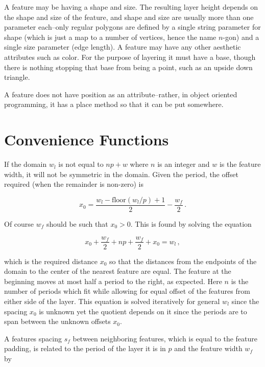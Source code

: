 \documentclass{article}
\begin{document}
A feature may be having a shape and size. The resulting layer height depends on the shape and size of the feature, and shape and size are usually more than one parameter each--only regular polygons are defined by a single string parameter for shape (which is just a map to a number of vertices, hence the name $n$-gon) and a single size parameter (edge length). A feature may have any other aesthetic attributes such as color. For the purpose of layering it must have a base, though there is nothing stopping that base from being a point, such as an upside down triangle.

A feature does not have position as an attribute--rather, in object oriented programming, it has a place method so that it can be put somewhere.

\section{Convenience Functions}

If the domain $w_l$ is not equal to $np + w$ where $n$ is an integer and $w$ is the feature width, it will not be symmetric in the domain. Given the period, the offset required (when the remainder is non-zero) is 

$$x_0 = \frac{w_l - \text{floor}(w_l / p) + 1}{2} - \frac{w_f}{2}\,. $$

Of course $w_f$ should be such that $x_0 > 0$. This is found by solving the equation

$$x_0 + \frac{w_f}{2} + np + \frac{w_f}{2} + x_0 = w_l\,, $$

which is the required distance $x_0$ so that the distances from the endpoints of the domain to the center of the nearest feature are equal. The feature at the beginning moves at most half a period to the right, as expected. Here $n$ is the number of periods which fit while allowing for equal offset of the features from either side of the layer. This equation is solved iteratively for general $w_l$ since the spacing $x_0$ is unknown yet the quotient depends on it since the periods are to span between the unknown offsets $x_0$.


A features spacing $s_f$ between neighboring features, which is equal to the feature padding, is related to the period of the layer it is in $p$ and the feature width $w_f$ by
\end{document}
